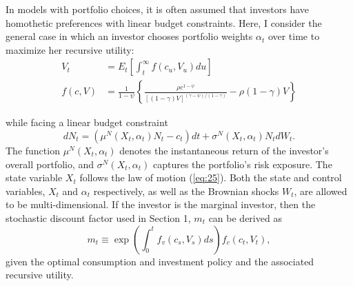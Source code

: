 \documentclass{article}
\begin{document}
In models with portfolio choices, it is often assumed that investors have homothetic preferences with linear budget constraints. Here, I consider the general case in which an investor chooses portfolio weights $\alpha_{t}$ over time to maximize her recursive utility:
\begin{align*}
V_{t}&=E_{t}\left[\int_{t}^{\infty}f(c_{u},V_{u})du\right] \\
f(c,V)&=\frac{1}{1-\psi}\left\{\frac{\rho c^{1-\psi}}{[(1-\gamma)V]^{(\gamma-\psi)/(1-\gamma)}}-\rho(1-\gamma)V\right\}
\end{align*}

\clearpage

while facing a linear budget constraint
\[
dN_{t}=(\mu^{N}(X_{t},\alpha_{t})N_{t}-c_{t})dt+\sigma^{N}(X_{t},\alpha_{t})N_{t}dW_{t}.
\]
The function $\mu^{N}(X_{t},\alpha_{t})$ denotes the instantaneous return of the investor's overall portfolio, and $\sigma^{N}(X_{t},\alpha_{t})$ captures the portfolio's risk exposure. The state variable $X_{t}$ follows the law of motion (\ref{eq:25}). Both the state and control variables, $X_{t}$ and $\alpha_{t}$ respectively, as well as the Brownian shocks $W_{t}$, are allowed to be multi-dimensional. If the investor is the marginal investor, then the stochastic discount factor used in Section 1, $m_{t}$ can be derived as
\[
m_{t}\equiv \exp\left(\int_{0}^{t}f_{v}(c_{s},V_{s})ds\right)f_{c}(c_{t},V_{t}),
\]
given the optimal consumption and investment policy and the associated recursive utility.
\end{document}
